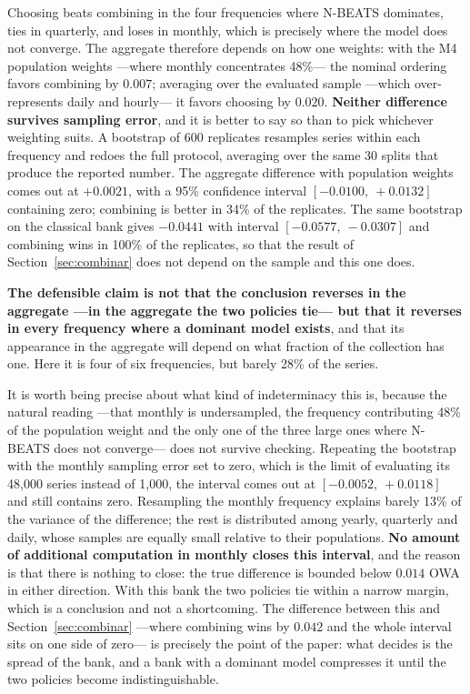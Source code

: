 Choosing beats combining in the four frequencies where N-BEATS dominates, ties in
quarterly, and loses in monthly, which is precisely where the model does not converge. The
aggregate therefore depends on how one weights: with the M4 population weights ---where
monthly concentrates 48\%--- the nominal ordering favors combining by $0.007$; averaging
over the evaluated sample ---which over-represents daily and hourly--- it favors choosing
by $0.020$. \textbf{Neither difference survives sampling error}, and it is better to say
so than to pick whichever weighting suits. A bootstrap of 600 replicates resamples series
within each frequency and redoes the full protocol, averaging over the same 30 splits that
produce the reported number. The aggregate difference with population weights comes out at
$+0.0021$, with a 95\% confidence interval $[-0.0100,\ +0.0132]$ containing zero;
combining is better in 34\% of the replicates. The same bootstrap on the classical bank
gives $-0.0441$ with interval $[-0.0577,\ -0.0307]$ and combining wins in 100\% of the
replicates, so that the result of Section~\ref{sec:combinar} does not depend on the sample
and this one does.

\textbf{The defensible claim is not that the conclusion reverses in the aggregate ---in
the aggregate the two policies tie--- but that it reverses in every frequency where a
dominant model exists}, and that its appearance in the aggregate will depend on what
fraction of the collection has one. Here it is four of six frequencies, but barely 28\% of
the series.

It is worth being precise about what kind of indeterminacy this is, because the natural
reading ---that monthly is undersampled, the frequency contributing 48\% of the population
weight and the only one of the three large ones where N-BEATS does not converge--- does
not survive checking. Repeating the bootstrap with the monthly sampling error set to zero,
which is the limit of evaluating its 48{,}000 series instead of 1{,}000, the interval
comes out at $[-0.0052,\ +0.0118]$ and still contains zero. Resampling the monthly
frequency explains barely 13\% of the variance of the difference; the rest is distributed
among yearly, quarterly and daily, whose samples are equally small relative to their
populations. \textbf{No amount of additional computation in monthly closes this interval},
and the reason is that there is nothing to close: the true difference is bounded below
$0.014$ OWA in either direction. With this bank the two policies tie within a narrow
margin, which is a conclusion and not a shortcoming. The difference between this and
Section~\ref{sec:combinar} ---where combining wins by $0.042$ and the whole interval sits
on one side of zero--- is precisely the point of the paper: what decides is the spread of
the bank, and a bank with a dominant model compresses it until the two policies become
indistinguishable.

